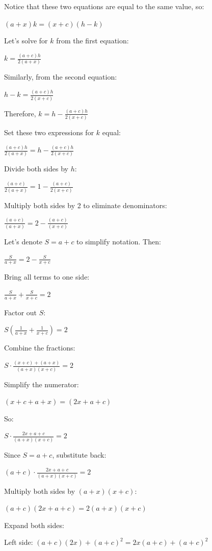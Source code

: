 \begin{tcolorbox}[
  title=Multiagent Collaborative Reasoning Trace Data Sample,
  breakable,
  colback=white,
  colframe=black
]
Notice that these two equations are equal to the same value, so:

\( (a + x)k = (x + c)(h - k) \)

Let’s solve for \( k \) from the first equation:

\( k = \frac{(a + c) h}{2(a + x)} \)

Similarly, from the second equation:

\( h - k = \frac{(a + c) h}{2(x + c)} \)

Therefore, \( k = h - \frac{(a + c) h}{2(x + c)} \)

Set these two expressions for \( k \) equal:

\( \frac{(a + c) h}{2(a + x)} = h - \frac{(a + c) h}{2(x + c)} \)

Divide both sides by \( h \):

\( \frac{(a + c)}{2(a + x)} = 1 - \frac{(a + c)}{2(x + c)} \)

Multiply both sides by 2 to eliminate denominators:

\( \frac{(a + c)}{(a + x)} = 2 - \frac{(a + c)}{(x + c)} \)

Let’s denote \( S = a + c \) to simplify notation. Then:

\( \frac{S}{a + x} = 2 - \frac{S}{x + c} \)

Bring all terms to one side:

\( \frac{S}{a + x} + \frac{S}{x + c} = 2 \)

Factor out \( S \):

\( S \left( \frac{1}{a + x} + \frac{1}{x + c} \right) = 2 \)

Combine the fractions:

\( S \cdot \frac{(x + c) + (a + x)}{(a + x)(x + c)} = 2 \)

Simplify the numerator:

\( (x + c + a + x) = (2x + a + c) \)

So:

\( S \cdot \frac{2x + a + c}{(a + x)(x + c)} = 2 \)

Since \( S = a + c \), substitute back:

\( (a + c) \cdot \frac{2x + a + c}{(a + x)(x + c)} = 2 \)

Multiply both sides by \( (a + x)(x + c) \):

\( (a + c)(2x + a + c) = 2(a + x)(x + c) \)

Expand both sides:

Left side: \( (a + c)(2x) + (a + c)^2 = 2x(a + c) + (a + c)^2 \)


\end{tcolorbox}
